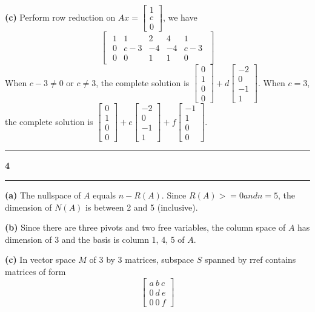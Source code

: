\documentclass[11pt]{article}
\newcommand\question[2]{\vspace{.25in}\hrule\textbf{#1 #2}\vspace{.5em}\hrule\vspace{.10in}}
\renewcommand\part[1]{\vspace{.10in}\textbf{(#1)}}
\begin{document}
\part{c} 
Perform row reduction on \(Ax = \begin{bmatrix} 1 \\ c \\ 0 \end{bmatrix}\), we have
$$\begin{bmatrix}\begin{array}{cccc|c} 1&1&2&4&1 \\ 0&c-3&-4&-4&c-3 \\ 0&0&1&1&0 \end{array}\end{bmatrix}$$
When \(c - 3 \neq 0\) or \(c \neq 3\), the complete solution is \(\begin{bmatrix} 0 \\ 1 \\ 0 \\ 0 \end{bmatrix} + d\begin{bmatrix} -2 \\ 0 \\ -1 \\ 1 \end{bmatrix}\). When \(c = 3\), the complete solution is \(\begin{bmatrix} 0 \\ 1 \\ 0 \\ 0 \end{bmatrix} + e\begin{bmatrix} -2 \\ 0 \\ -1 \\ 1 \end{bmatrix} + f\begin{bmatrix} -1 \\ 1 \\ 0 \\ 0 \end{bmatrix}\).

\question{4}{}
\part{a} The nullspace of \(A\) equals \(n - R(A)\). Since \(R(A) >= 0 and n = 5\), the dimension of \(N(A)\) is between 2 and 5 (inclusive).

\part{b} Since there are three pivots and two free variables, the column space of \(A\) has dimension of 3 and the basis is column 1, 4, 5 of \(A\).

\part{c} In vector space \(M\) of 3 by 3 matrices, subspace \(S\) spanned by rref contains matrices of form
$$\begin{bmatrix} a \ b \ c \\ 0 \ d \ e \\ 0 \ 0 \ f \end{bmatrix}$$
\end{document}
